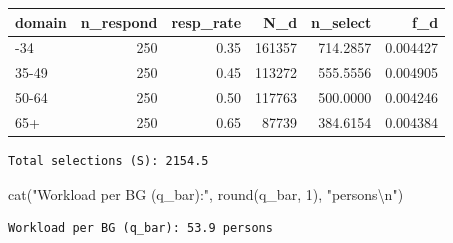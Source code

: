 \documentclass[
  11pt,
]{article}
\newenvironment{Shaded}{\begin{snugshade}}{\end{snugshade}}
\newcommand{\CommentTok}[1]{\textcolor[rgb]{0.37,0.37,0.37}{#1}}
\newcommand{\DecValTok}[1]{\textcolor[rgb]{0.68,0.00,0.00}{#1}}
\newcommand{\FunctionTok}[1]{\textcolor[rgb]{0.28,0.35,0.67}{#1}}
\newcommand{\NormalTok}[1]{\textcolor[rgb]{0.00,0.23,0.31}{#1}}
\newcommand{\OtherTok}[1]{\textcolor[rgb]{0.00,0.23,0.31}{#1}}
\newcommand{\SpecialCharTok}[1]{\textcolor[rgb]{0.37,0.37,0.37}{#1}}
\newcommand{\StringTok}[1]{\textcolor[rgb]{0.13,0.47,0.30}{#1}}
\begin{document}
\begin{longtable}[]{@{}lrrrrr@{}}
\toprule\noalign{}
domain & n\_respond & resp\_rate & N\_d & n\_select & f\_d \\
\midrule\noalign{}
\endhead
\bottomrule\noalign{}
\endlastfoot
18-34 & 250 & 0.35 & 161357 & 714.2857 & 0.004427 \\
35-49 & 250 & 0.45 & 113272 & 555.5556 & 0.004905 \\
50-64 & 250 & 0.50 & 117763 & 500.0000 & 0.004246 \\
65+ & 250 & 0.65 & 87739 & 384.6154 & 0.004384 \\
\end{longtable}

\begin{Shaded}
\end{Shaded}

\begin{verbatim}
Total selections (S): 2154.5 
\end{verbatim}

\begin{Shaded}
\begin{Highlighting}[]
\FunctionTok{cat}\NormalTok{(}\StringTok{"Workload per BG (q\_bar):"}\NormalTok{, }\FunctionTok{round}\NormalTok{(q\_bar, }\DecValTok{1}\NormalTok{), }\StringTok{"persons}\SpecialCharTok{\textbackslash{}n}\StringTok{"}\NormalTok{)}
\end{Highlighting}
\end{Shaded}

\begin{verbatim}
Workload per BG (q_bar): 53.9 persons
\end{verbatim}
\end{document}
